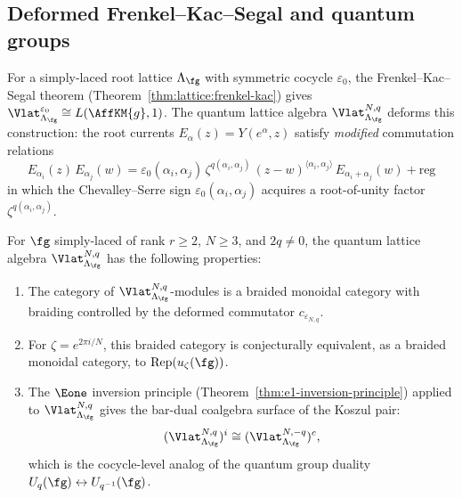 \subsection{Deformed Frenkel--Kac--Segal and quantum groups}

\begin{remark}\label{rem:lattice:deformed-fks}
For a simply-laced root lattice $\Lambda_\fg$ with symmetric cocycle
$\varepsilon_0$, the Frenkel--Kac--Segal theorem
(Theorem~\ref{thm:lattice:frenkel-kac}) gives
$\Vlat_{\Lambda_\fg}^{\varepsilon_0} \cong L(\AffKM{g}, 1)$.
The quantum lattice algebra $\Vlat_{\Lambda_\fg}^{N,q}$ deforms this
construction: the root currents $E_\alpha(z) = Y(e^\alpha, z)$
satisfy \emph{modified} commutation relations
\begin{equation}\label{eq:lattice:deformed-fks-ope}
E_{\alpha_i}(z)\, E_{\alpha_j}(w)
= \varepsilon_0(\alpha_i,\alpha_j)\,\zeta^{q(\alpha_i,\alpha_j)}\,
 (z-w)^{\langle\alpha_i,\alpha_j\rangle}\,
 E_{\alpha_i+\alpha_j}(w) + \text{reg}
\end{equation}
in which the Chevalley--Serre sign
$\varepsilon_0(\alpha_i,\alpha_j)$ acquires a root-of-unity factor
$\zeta^{q(\alpha_i,\alpha_j)}$.
\end{remark}

\begin{conjecture}
\label{conj:lattice:quantum-group-connection}
For $\fg$ simply-laced of rank $r \geq 2$, $N \geq 3$, and
$2q\neq0$, the quantum lattice algebra $\Vlat_{\Lambda_\fg}^{N,q}$
has the following properties:
\begin{enumerate}[label=(\roman*)]
\item The category of $\Vlat_{\Lambda_\fg}^{N,q}$-modules is a
 braided monoidal category with braiding controlled by the
 deformed commutator $c_{\varepsilon_{N,q}}$.
\item For $\zeta = e^{2\pi i/N}$, this braided category is
 conjecturally equivalent, as a braided monoidal category, to
 $\operatorname{Rep}(u_\zeta(\fg))$.
\item The $\Eone$ inversion principle
 \textup{(}Theorem~\textup{\ref{thm:e1-inversion-principle})}
 applied to $\Vlat_{\Lambda_\fg}^{N,q}$ gives the bar-dual coalgebra
 surface of the Koszul pair:
 \[
 (\Vlat_{\Lambda_\fg}^{N,q})^i
 \cong (\Vlat_{\Lambda_\fg}^{N,-q})^c,
 \]
 which is the cocycle-level analog of the quantum group duality
 $U_q(\fg) \leftrightarrow U_{q^{-1}}(\fg)$.
\end{enumerate}
\end{conjecture}


